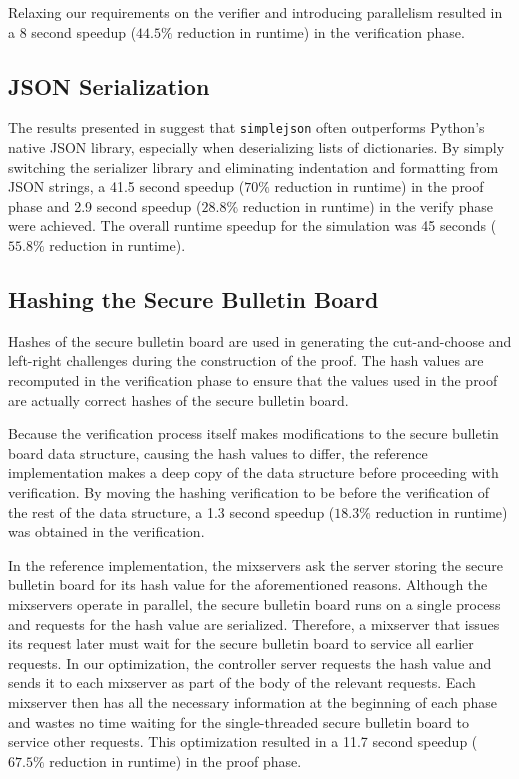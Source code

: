 Relaxing our requirements on the verifier and introducing parallelism resulted in a 8 second speedup ($44.5\%$ reduction in runtime) in the verification phase.

\subsection{JSON Serialization} \label{perf:optimizations:json}

The results presented in \cite{json-bench} suggest that \texttt{simplejson} often outperforms Python's native JSON library, especially when deserializing lists of dictionaries. By simply switching the serializer library and eliminating indentation and formatting from JSON strings, a 41.5 second speedup ($70\%$ reduction in runtime) in the proof phase and 2.9 second speedup ($28.8\%$ reduction in runtime) in the verify phase were achieved. The overall runtime speedup for the simulation was 45 seconds ($55.8\%$ reduction in runtime).

\subsection{Hashing the Secure Bulletin Board} \label{perf:optimizations:sbb}

Hashes of the secure bulletin board are used in generating the cut-and-choose and left-right challenges during the construction of the proof. The hash values are recomputed in the verification phase to ensure that the values used in the proof are actually correct hashes of the secure bulletin board.

Because the verification process itself makes modifications to the secure bulletin board data structure, causing the hash values to differ, the reference implementation makes a deep copy of the data structure before proceeding with verification. By moving the hashing verification to be before the verification of the rest of the data structure, a 1.3 second speedup ($18.3\%$ reduction in runtime) was obtained in the verification.

In the reference implementation, the mixservers ask the server storing the secure bulletin board for its hash value for the aforementioned reasons. Although the mixservers operate in parallel, the secure bulletin board runs on a single process and requests for the hash value are serialized. Therefore, a mixserver that issues its request later must wait for the secure bulletin board to service all earlier requests. In our optimization, the controller server requests the hash value and sends it to each mixserver as part of the body of the relevant requests. Each mixserver then has all the necessary information at the beginning of each phase and wastes no time waiting for the single-threaded secure bulletin board to service other requests. This optimization resulted in a 11.7 second speedup ($67.5\%$ reduction in runtime) in the proof phase.

